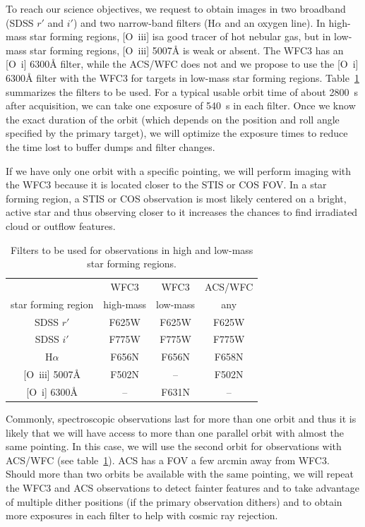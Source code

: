\documentclass[12pt]{article}
\begin{document}
To reach our science objectives, we request to obtain images in two broadband (SDSS $r'$ and $i'$) and two narrow-band filters (H$\alpha$ and an oxygen line). In high-mass star forming regions, [O~{\sc iii}] isa good tracer of hot nebular gas, but in low-mass star forming regions, [O~{\sc iii}] 5007\AA{} is weak or absent. The WFC3 has an [O~{\sc i}] 6300\AA{} filter, while the ACS/WFC does not and we propose to use the [O~{\sc i}] 6300\AA{} filter with the WFC3 for targets in low-mass star forming regions. Table~\ref{tab:setup} summarizes the filters to be used.
For a typical usable orbit time of about 2800~s after acquisition, we can take one exposure of 540~s in each filter. Once we know the exact duration of the orbit (which depends on the position and roll angle specified by the primary target), we will optimize the exposure times to reduce the time lost to buffer dumps and filter changes.

If we have only one orbit with a specific pointing, we will perform imaging with the WFC3 because it is located closer to the STIS or COS FOV. In a star forming region, a STIS or COS observation is most likely centered on a bright, active star and thus observing closer to it increases the chances to find irradiated cloud or outflow features. 

\begin{table}[htbp]
    \centering
    \begin{tabular}{c|ccc}
    \hline\hline
           & WFC3 & WFC3 & ACS/WFC \\
        star forming region & high-mass & low-mass & any\\
        \hline
        SDSS $r'$ & F625W & F625W & F625W \\
        SDSS $i'$ & F775W & F775W & F775W\\
        H$\alpha$ & F656N & F656N & F658N\\{}
        [O~{\sc iii}] 5007\AA{} & F502N & -- & F502N\\{}
        [O~{\sc i}] 6300\AA{}& -- & F631N & -- \\
        \hline
    \end{tabular}
    \caption{Filters to be used for observations in high and low-mass star forming regions.}
    \label{tab:setup}
\end{table}


Commonly, spectroscopic observations last for more than one orbit and thus it is likely that we will have access to more than one parallel orbit with almost the same pointing. In this case, we will use the second orbit for observations with ACS/WFC (see table~\ref{tab:setup}). ACS has a FOV a few arcmin away from WFC3. Should more than two orbits be available with the same pointing, we will repeat the WFC3 and ACS observations to detect fainter features and to take advantage of multiple dither positions (if the primary observation dithers) and to obtain more exposures in each filter to help with cosmic ray rejection. 
\end{document}
